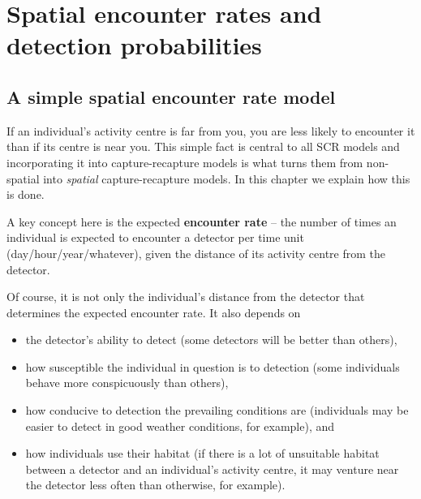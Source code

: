 \chapter{Spatial encounter rates and detection probabilities}
\label{chap:ER+detfun}


\section{A simple spatial encounter rate model}
\label{sec:ER+detfun.simple.ER.model}

If an individual's activity centre is far from you, you are less likely to encounter it than if its centre is near you. This simple fact is central to all SCR models and incorporating it into capture-recapture models is what turns them from non-spatial into \textit{spatial} capture-recapture models. In this chapter we explain how this is done. 

A key concept here is the expected \textbf{encounter rate} -- the number of times an individual is expected to encounter a detector per time unit (day/hour/year/whatever), given the distance of its activity centre from the detector. %

Of course, it is not only the individual's distance from the detector that determines the expected encounter rate. It also depends on 
\begin{itemize}
\item the detector's ability to detect (some detectors will be better than others), 
\item how susceptible the individual in question is to detection (some individuals behave more conspicuously than others), 
\item how conducive to detection the prevailing conditions are (individuals may be easier to detect in good weather conditions, for example), and 
\item how individuals use their habitat (if there is a lot of unsuitable habitat between a detector and an individual's activity centre, it may venture near the detector less often than otherwise, for example).  
\end{itemize}

